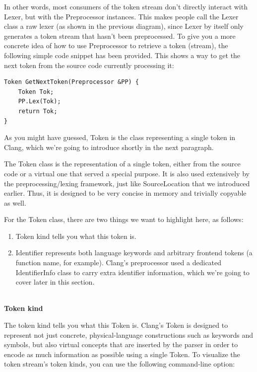 In other words, most consumers of the token stream don't directly interact with Lexer, but with the Preprocessor instances. This makes people call the Lexer class a raw lexer (as shown in the previous diagram), since Lexer by itself only generates a token stream that hasn't been preprocessed. To give you a more concrete idea of how to use Preprocessor to retrieve a token (stream), the following simple code snippet has been provided. This shows a way to get the next token from the source code currently processing it:

\begin{lstlisting}[style=styleCXX]
Token GetNextToken(Preprocessor &PP) {
	Token Tok;
	PP.Lex(Tok);
	return Tok;
}
\end{lstlisting}

As you might have guessed, Token is the class representing a single token in Clang, which we're going to introduce shortly in the next paragraph.


The Token class is the representation of a single token, either from the source code or a virtual one that served a special purpose. It is also used extensively by the preprocessing/lexing framework, just like SourceLocation that we introduced earlier. Thus, it is designed to be very concise in memory and trivially copyable as well.

For the Token class, there are two things we want to highlight here, as follows:

\begin{enumerate}
\item Token kind tells you what this token is.
\item Identifier represents both language keywords and arbitrary frontend tokens (a function name, for example). Clang's preprocessor used a dedicated IdentifierInfo class to carry extra identifier information, which we're going to cover later in this section.
\end{enumerate}

\hspace*{\fill} \\ %
\noindent
\textbf{Token kind}

The token kind tells you what this Token is. Clang's Token is designed to represent not just concrete, physical-language constructions such as keywords and symbols, but also virtual concepts that are inserted by the parser in order to encode as much information as possible using a single Token. To visualize the token stream's token kinds, you can use the following command-line option:

